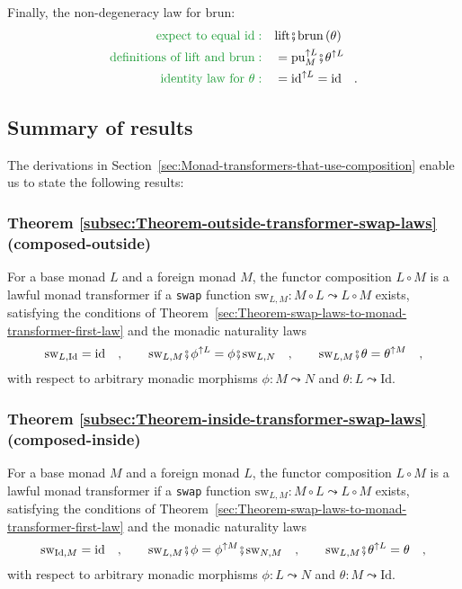 Finally, the non-degeneracy law for $\text{brun}$:
\begin{align*}
{\color{greenunder}\text{expect to equal }\text{id}:}\quad & \text{lift}\bef\text{brun}\left(\theta\right)\\
{\color{greenunder}\text{definitions of }\text{lift}\text{ and }\text{brun}:}\quad & =\text{pu}_{M}^{\uparrow L}\bef\theta^{\uparrow L}\\
{\color{greenunder}\text{identity law for }\theta:}\quad & =\text{id}^{\uparrow L}=\text{id}\quad.
\end{align*}


\subsection{Summary of results}

The derivations in Section~\ref{sec:Monad-transformers-that-use-composition}
enable us to state the following results:

\subsubsection{Theorem \label{subsec:Theorem-outside-transformer-swap-laws}\ref{subsec:Theorem-outside-transformer-swap-laws}
(composed-outside)}

For a base monad $L$ and a foreign monad $M$, the functor composition
$L\circ M$ is a lawful monad transformer if a \lstinline!swap!
function $\text{sw}_{L,M}:M\circ L\leadsto L\circ M$ exists, satisfying
the conditions of Theorem~\ref{sec:Theorem-swap-laws-to-monad-transformer-first-law}
and the monadic naturality laws
\[
\text{sw}_{L,\text{Id}}=\text{id}\quad,\quad\quad\text{sw}_{L,M}\bef\phi^{\uparrow L}=\phi\bef\text{sw}_{L,N}\quad,\quad\quad\text{sw}_{L,M}\bef\theta=\theta^{\uparrow M}\quad,
\]
with respect to arbitrary monadic morphisms $\phi:M\leadsto N$ and
$\theta:L\leadsto\text{Id}$. 

\subsubsection{Theorem \label{subsec:Theorem-inside-transformer-swap-laws}\ref{subsec:Theorem-inside-transformer-swap-laws}
(composed-inside)}

For a base monad $M$ and a foreign monad $L$, the functor composition
$L\circ M$ is a lawful monad transformer if a \lstinline!swap!
function $\text{sw}_{L,M}:M\circ L\leadsto L\circ M$ exists, satisfying
the conditions of Theorem~\ref{sec:Theorem-swap-laws-to-monad-transformer-first-law}
and the monadic naturality laws
\[
\text{sw}_{\text{Id},M}=\text{id}\quad,\quad\quad\text{sw}_{L,M}\bef\phi=\phi^{\uparrow M}\bef\text{sw}_{N,M}\quad,\quad\quad\text{sw}_{L,M}\bef\theta^{\uparrow L}=\theta\quad,
\]
with respect to arbitrary monadic morphisms $\phi:L\leadsto N$ and
$\theta:M\leadsto\text{Id}$. 

